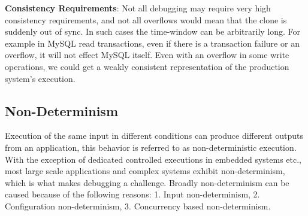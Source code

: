 




\textbf{Consistency Requirements}: Not all debugging may require very high consistency requirements, and not all overflows would mean that the clone is suddenly out of sync.
In such cases the time-window can be arbitrarily long. 
For example in MySQL read transactions, even if there is a transaction failure or an overflow, it will not effect MySQL itself.
Even with an overflow in some write operations, we could get a weakly consistent representation of the production system's execution.


\subsection{Non-Determinism}
\label{sec:nonDeterminism}

Execution of the same input in different conditions can produce different outputs from an application, this behavior is referred to as non-deterministic execution.
With the exception of dedicated controlled executions in embedded systems etc., most large scale applications and complex systems exhibit non-determinism, which is what makes debugging a challenge.
Broadly non-determinism can be caused because of the following reasons: 1. Input non-determinism, 2. Configuration non-determinism, 3. Concurrency based non-determinism.

